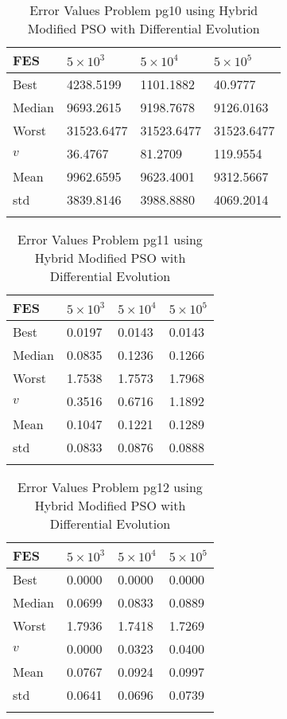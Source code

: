 \documentclass[10pt, a4paper]{book}
\begin{document}
\begin{center}
\begin{longtable}{l l l l}
FES & $5 \times 10^{3}$ & $5 \times 10^{4}$ & $5 \times 10^{5}$ \\
\hline
Best & 4238.5199 & 1101.1882 & 40.9777 \\
Median & 9693.2615 & 9198.7678 & 9126.0163 \\
Worst & 31523.6477 & 31523.6477 & 31523.6477 \\
$v$ & 36.4767 & 81.2709 & 119.9554 \\
Mean & 9962.6595 & 9623.4001 & 9312.5667 \\
std & 3839.8146 & 3988.8880 & 4069.2014 \\
\caption{ Error Values Problem pg10 using Hybrid Modified PSO with Differential Evolution }
\end{longtable}
\end{center}

\begin{center}
\begin{longtable}{l l l l}
FES & $5 \times 10^{3}$ & $5 \times 10^{4}$ & $5 \times 10^{5}$ \\
\hline
Best & 0.0197 & 0.0143 & 0.0143 \\
Median & 0.0835 & 0.1236 & 0.1266 \\
Worst & 1.7538 & 1.7573 & 1.7968 \\
$v$ & 0.3516 & 0.6716 & 1.1892 \\
Mean & 0.1047 & 0.1221 & 0.1289 \\
std & 0.0833 & 0.0876 & 0.0888 \\
\caption{ Error Values Problem pg11 using Hybrid Modified PSO with Differential Evolution }
\end{longtable}
\end{center}

\begin{center}
\begin{longtable}{l l l l}
FES & $5 \times 10^{3}$ & $5 \times 10^{4}$ & $5 \times 10^{5}$ \\
\hline
Best & 0.0000 & 0.0000 & 0.0000 \\
Median & 0.0699 & 0.0833 & 0.0889 \\
Worst & 1.7936 & 1.7418 & 1.7269 \\
$v$ & 0.0000 & 0.0323 & 0.0400 \\
Mean & 0.0767 & 0.0924 & 0.0997 \\
std & 0.0641 & 0.0696 & 0.0739 \\
\caption{ Error Values Problem pg12 using Hybrid Modified PSO with Differential Evolution }
\end{longtable}
\end{center}
\end{document}
